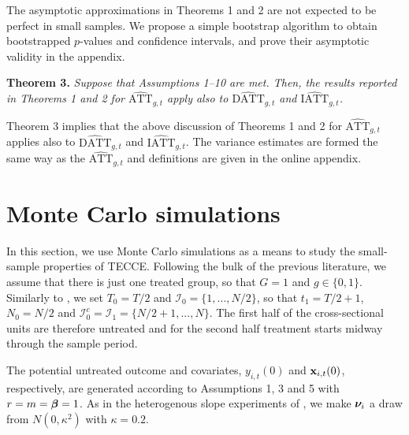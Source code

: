 \documentclass[12pt,fleqn]{article}
\begin{document}
  The asymptotic approximations in Theorems 1 and 2 are not expected to be perfect in small samples. We propose a simple bootstrap algorithm to obtain bootstrapped $p$-values and confidence intervals, and prove their asymptotic validity in the appendix.
  
  \bigskip
  
  \noindent \textbf{Theorem 3.} \emph{Suppose that Assumptions 1--10 are met. Then, the results reported in Theorems 1 and 2 for $\widehat{\mathrm{ATT}}_{g,t}$ apply also to $\widehat{\mathrm{DATT}}_{g,t}$ and $\widehat{\mathrm{IATT}}_{g,t}$.}
  
  \bigskip
  
  Theorem 3 implies that the above discussion of Theorems 1 and 2 for $\widehat{\mathrm{ATT}}_{g,t}$ applies also to $\widehat{\mathrm{DATT}}_{g,t}$ and $\widehat{\mathrm{IATT}}_{g,t}$. The variance estimates are formed the same way as the $\widehat{\mathrm{ATT}}_{g,t}$ and definitions are given in the online appendix.
  
  \section{Monte Carlo simulations}
  
  In this section, we use Monte Carlo simulations as a means to study the small-sample properties of TECCE. Following the bulk of the previous literature, we assume that there is just one treated group, so that $G=1$ and $g \in \{0,1\}$. Similarly to \citet{chan2022pcdid}, we set $T_0 = T/2$ and $\mathcal{I}_0 = \{1,...,N/2\}$, so that $t_1 = T/2+1$, $N_0 = N/2$ and $\mathcal{I}_0^c = \mathcal{I}_1 = \{N/2+1,...,N\}$. The first half of the cross-sectional units are therefore untreated and for the second half treatment starts midway through the sample period.
  
  The potential untreated outcome and covariates, $y_{i,t}(0)$ and $\mathbf{x}_{i,t}(0)$, respectively, are generated according to Assumptions 1, 3 and 5 with $r=m= \boldsymbol{\beta} = 1$. As in the heterogenous slope experiments of \citet{pesaran2006estimation}, we make $\boldsymbol{\nu}_i$ a draw from $N(0,\kappa^2)$ with $\kappa = 0.2$.
  
\end{document}
